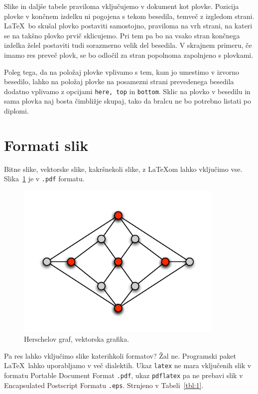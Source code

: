 \documentclass[a4paper, 12pt]{book}
\begin{document}
Slike in daljše tabele praviloma vključujemo v dokument kot plovke. 
Pozicija plovke v končnem izdelku ni pogojena s tekom besedila, temveč z izgledom strani. 
\LaTeX\ bo skušal plovko postaviti samostojno, praviloma na vrh strani, na kateri se na takšno plovko prvič sklicujemo. 
Pri tem pa bo na vsako stran končnega izdelka želel postaviti tudi sorazmerno velik del besedila. 
V skrajnem primeru, če imamo res preveč plovk, se bo odločil za stran popolnoma zapolnjeno s plovkami.

Poleg tega, da na položaj plovke vplivamo s tem, kam jo umestimo v izvorno besedilo, lahko na položaj plovke na posamezni strani prevedenega besedila dodatno vplivamo z opcijami \texttt{here, top} in \texttt{bottom}.
Sklic na plovko v besedilu in sama plovka naj bosta čimbližje skupaj, tako da bralcu ne bo potrebno listati po diplomi.


\section{Formati slik}

Bitne slike, vektorske slike, kakršnekoli slike, z \LaTeX{}om lahko vključimo vse.
Slika~\ref{pic1} je v {\tt .pdf} formatu.
\begin{figure}[htb]
\begin{center}
\includegraphics[width=10cm]{pic1.pdf}
\end{center}
\caption{Herschelov graf, vektorska grafika.}
\label{pic1}
\end{figure}
Pa res lahko vključimo slike katerihkoli formatov? 
Žal ne. 
Programski paket \LaTeX\ lahko uporabljamo v več dialektih. 
Ukaz {\tt latex} ne mara vključenih slik v formatu Portable Document Format {\tt .pdf}, ukaz {\tt pdflatex} pa ne prebavi slik v Encapsulated Postscript Formatu {\tt .eps}.
Strnjeno v Tabeli~\ref{tbl:1}.
\end{document}
